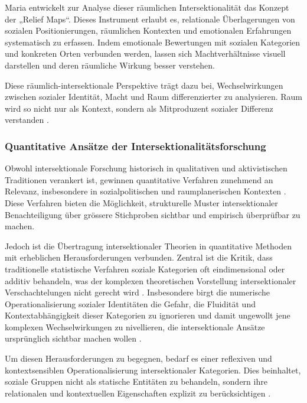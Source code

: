 Maria \textcite{rodo-de-zarateDevelopingGeographiesIntersectionality2014, rodo-de-zarateYoungLesbiansNegotiating2015} entwickelt zur Analyse dieser räumlichen Intersektionalität das Konzept der „Relief Maps“. Dieses Instrument erlaubt es, relationale Überlagerungen von sozialen Positionierungen, räumlichen Kontexten und emotionalen Erfahrungen systematisch zu erfassen. Indem emotionale Bewertungen mit sozialen Kategorien und konkreten Orten verbunden werden, lassen sich Machtverhältnisse visuell darstellen und deren räumliche Wirkung besser verstehen.

Diese räumlich-intersektionale Perspektive trägt dazu bei, Wechselwirkungen zwischen sozialer Identität, Macht und Raum differenzierter zu analysieren. Raum wird so nicht nur als Kontext, sondern als Mitproduzent sozialer Differenz verstanden \parencite{rodo-de-zarateIntersectionalityFeministGeographies2018}.

\subsubsection{Quantitative Ansätze der Intersektionalitätsforschung}

Obwohl intersektionale Forschung historisch in qualitativen und aktivistischen Traditionen verankert ist, gewinnen quantitative Verfahren zunehmend an Relevanz, insbesondere in sozialpolitischen und raumplanerischen Kontexten \parencite{bauerIntersectionalityQuantitativeResearch2021}. Diese Verfahren bieten die Möglichkeit, strukturelle Muster intersektionaler Benachteiligung über grössere Stichproben sichtbar und empirisch überprüfbar zu machen.

Jedoch ist die Übertragung intersektionaler Theorien in quantitative Methoden mit erheblichen Herausforderungen verbunden. Zentral ist die Kritik, dass traditionelle statistische Verfahren soziale Kategorien oft eindimensional oder additiv behandeln, was der komplexen theoretischen Vorstellung intersektionaler Verschachtelungen nicht gerecht wird \parencite{hancockWhenMultiplicationDoesnt2007, bowlegInvitedReflectionQuantifying2016}. Insbesondere birgt die numerische Operationalisierung sozialer Identitäten die Gefahr, die Fluidität und Kontextabhängigkeit dieser Kategorien zu ignorieren und damit ungewollt jene komplexen Wechselwirkungen zu nivellieren, die intersektionale Ansätze ursprünglich sichtbar machen wollen \parencite{scottIntersectionalityQuantitativeMethods2017}.

Um diesen Herausforderungen zu begegnen, bedarf es einer reflexiven und kontextsensiblen Operationalisierung intersektionaler Kategorien. Dies beinhaltet, soziale Gruppen nicht als statische Entitäten zu behandeln, sondern ihre relationalen und kontextuellen Eigenschaften explizit zu berücksichtigen \parencite{rodo-de-zarateDevelopingGeographiesIntersectionality2014, websterCenteringSocialtechnicalRelations2021}.


